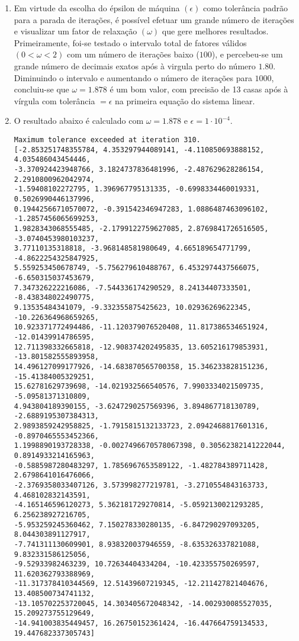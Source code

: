 \documentclass{article}
\newenvironment{arabenum}{
    \begin{enumerate}[label=\textbf{\arabic*})]
}{
    \end{enumerate}
}
\newenvironment{alphenum}{
    \begin{enumerate}[label=(\alph*)]
}{
    \end{enumerate}
}
\begin{document}
\begin{arabenum}
\begin{alphenum}
\item Em virtude da escolha do épsilon de máquina $(\epsilon)$ como tolerância
padrão para a parada de iterações, é possível efetuar um grande número de
iterações e visualizar um fator de relaxação $(\omega)$ que gere melhores
resultados. Primeiramente, foi-se testado o intervalo total de fatores válidos
$(0 < \omega < 2)$ com um número de iterações baixo ($100$), e percebeu-se
um grande número de decimais exatos após à virgula perto do número
$\boldsymbol{1.80}$. Diminuindo o intervalo e aumentando o número de iterações
para $1000$, concluiu-se que $\omega = \boldsymbol{1.878}$ é um bom valor,
com precisão de 13 casas após à vírgula com tolerância $= \epsilon$ na primeira
equação do sistema linear.

\item O resultado abaixo é calculado com $\omega = 1.878$ e
$\epsilon = 1 \cdot 10^{-4}$.

\begin{verbatim}
Maximum tolerance exceeded at iteration 310.
[-2.853251748355784, 4.353297944089141, -4.110850693888152, 4.035486043454446,
-3.370924423948766, 3.1824737836481996, -2.487629628286154, 2.2910800962042974,
-1.59408102272795, 1.396967795131335, -0.6998334460019331, 0.5026990446137996,
0.19442566710570072, -0.391542346947283, 1.0886487463096102, -1.2857456065699253,
1.9828343068555485, -2.1799122759627085, 2.8769841726516505, -3.0740453980103237,
3.77110135318818, -3.968148581980649, 4.665189654771799, -4.8622254325847925,
5.559253450678749, -5.756279610488767, 6.4532974437566075, -6.650315037453679,
7.347326222216086, -7.544336174290529, 8.24134407333501, -8.438348022490775,
9.13535484341079, -9.332355875425623, 10.02936269622345, -10.226364968659265,
10.923371772494486, -11.120379076520408, 11.817386534651924, -12.01439914786595,
12.711398332665818, -12.908374202495835, 13.605216179853931, -13.801582555893958,
14.496127099177926, -14.683870565700358, 15.346233828151236, -15.41384005329251,
15.62781629739698, -14.021932566540576, 7.9903334021509735, -5.09581371310809,
4.943804189390155, -3.6247290257569396, 3.894867718130789, -2.6889195307384313,
2.9893859242958825, -1.7915815132133723, 2.0942468817601316, -0.8970465553452366,
1.1998890193728338, -0.0027496670578067398, 0.30562382141222044, 0.8914933214165963,
-0.5885987280483297, 1.7856967653589122, -1.482784389711428, 2.6798641016476066,
-2.3769358033407126, 3.573998277219781, -3.2710554843163733, 4.468102832143591,
-4.165146596120273, 5.362181729270814, -5.0592130021293285, 6.256238927216705,
-5.953259245360462, 7.150278330280135, -6.847290297093205, 8.044303891127917,
-7.741311130609901, 8.938320037946559, -8.635326337821088, 9.832331586125056,
-9.52933982463239, 10.72634404334204, -10.423355750269597, 11.620362793388969,
-11.317378410344569, 12.51439607219345, -12.211427821404676, 13.408500734741132,
-13.105702253720045, 14.303405672048342, -14.002930085527035, 15.209273755129649,
-14.941003835449457, 16.26750152361424, -16.447664759134533, 19.447682337305743]
\end{verbatim}


\end{alphenum}
\end{arabenum}
\end{document}
